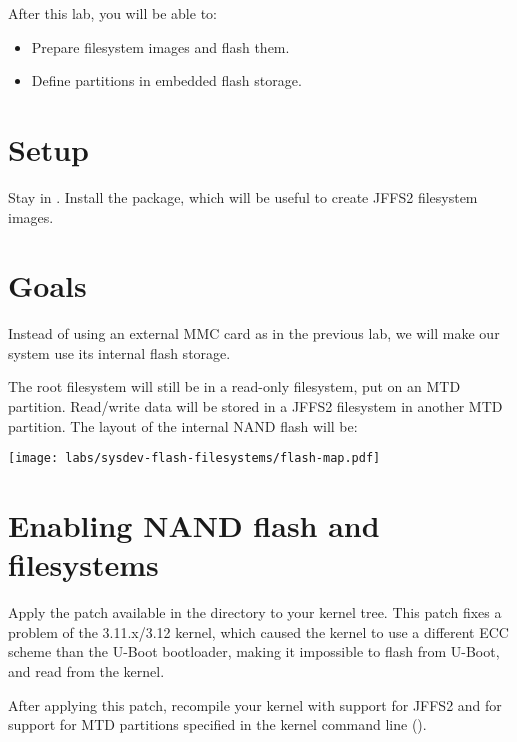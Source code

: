 
After this lab, you will be able to:
\begin{itemize}
\item Prepare filesystem images and flash them.
\item Define partitions in embedded flash storage.
\end{itemize}

\section{Setup}

Stay in . Install the
 package, which will be useful to create JFFS2
filesystem images.

\section{Goals}

Instead of using an external MMC card as in the previous lab, we will
make our system use its internal flash storage.

The root filesystem will still be in a read-only filesystem, put on an
MTD partition.  Read/write data will be stored in a JFFS2 filesystem
in another MTD partition. The layout of the internal NAND flash will
be:

\begin{center}
  \texttt{[image: labs/sysdev-flash-filesystems/flash-map.pdf]}
\end{center}

\section{Enabling NAND flash and filesystems}

Apply the 
patch available in the
 directory to your
kernel tree. This patch fixes a problem of the 3.11.x/3.12 kernel,
which caused the kernel to use a different ECC scheme than the U-Boot
bootloader, making it impossible to flash from U-Boot, and read from
the kernel.

After applying this patch, recompile your kernel with support for
JFFS2 and for support for MTD partitions specified in the kernel
command line ().

